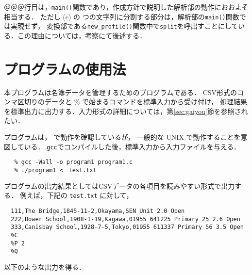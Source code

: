 \documentclass[a4j,11pt]{jarticle}
\begin{document}
＠＠＠行目は，\verb|main()|関数であり，作成方針で説明した解析部の動作におおよそ相当する．
ただし (c) の つの文字列に分割する部分は，解析部の\verb|main()|関数では実現せず，
変換部である\verb|new_profile()|関数中で\verb|split|を呼出すことにしている．この理由については，考察にて後述する．


\section{プログラムの使用法}\label{sec:use}


本プログラムは名簿データを管理するためのプログラムである．
CSV形式のコンマ区切りのデータと \% で始まるコマンドを標準入力から受け付け，
処理結果を標準出力に出力する．入力形式の詳細については，第\ref{sec:gaiyou}節を参照されたい．

プログラムは，                                   で動作を確認しているが，
一般的な UNIX で動作することを意図している．
\verb|gcc|でコンパイルした後，標準入力から入力ファイルを与える．

{\fontsize{10pt}{11pt} \selectfont
 \begin{verbatim}
   % gcc -Wall -o program1 program1.c
   % ./program1 <　test.txt
 \end{verbatim}
}

プログラムの出力結果としてはCSVデータの各項目を読みやすい形式で出力する．
例えば，下記の \verb|test.txt| に対して，

{\fontsize{10pt}{11pt} \selectfont
 \begin{verbatim}
  111,The Bridge,1845-11-2,Okayama,SEN Unit 2.0 Open
  222,Bower School,1908-1-19,Kagawa,01955 641225 Primary 25 2.6 Open
  333,Canisbay School,1928-7-5,Tokyo,01955 611337 Primary 56 3.5 Open
  %C
  %P 2
  %Q
 \end{verbatim}
}
\noindent %
以下のような出力を得る．
\end{document}

